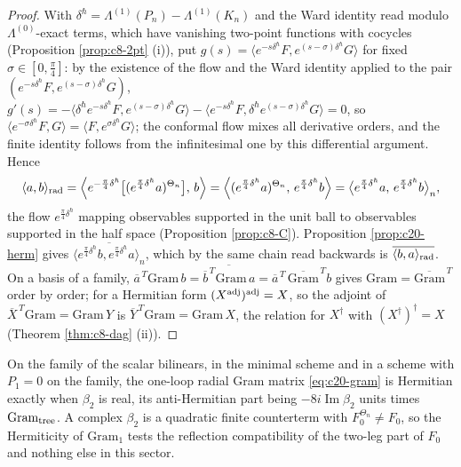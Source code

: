 \begin{proof}
With $\delta^\hbar=\Lambda^{(1)}(P_n)-\Lambda^{(1)}(K_n)$ and the Ward identity read modulo $\Lambda^{(0)}$-exact terms, which have vanishing two-point functions with cocycles (Proposition \ref{prop:c8-2pt} (i)), put $g(s)=\langle e^{-s\delta^\hbar}F,e^{(s-\sigma)\delta^\hbar}G\rangle$ for fixed $\sigma\in[0,\tfrac\pi4]$: by the existence of the flow and the Ward identity applied to the pair $(e^{-s\delta^\hbar}F,e^{(s-\sigma)\delta^\hbar}G)$, $g'(s)=-\langle\delta^\hbar e^{-s\delta^\hbar}F,e^{(s-\sigma)\delta^\hbar}G\rangle-\langle e^{-s\delta^\hbar}F,\delta^\hbar e^{(s-\sigma)\delta^\hbar}G\rangle=0$, so $\langle e^{-\sigma\delta^\hbar}F,G\rangle=\langle F,e^{\sigma\delta^\hbar}G\rangle$; the conformal flow mixes all derivative orders, and the finite identity follows from the infinitesimal one by this differential argument. Hence
\[
\langle a,b\rangle_{\rm rad}=\Big\langle e^{-\frac\pi4\delta^\hbar}\big[(e^{\frac\pi4\delta^\hbar}a)^{\Theta_n}\big],\,b\Big\rangle=\Big\langle(e^{\frac\pi4\delta^\hbar}a)^{\Theta_n},\,e^{\frac\pi4\delta^\hbar}b\Big\rangle=\big\langle e^{\frac\pi4\delta^\hbar}a,\,e^{\frac\pi4\delta^\hbar}b\big\rangle_n ,
\]
the flow $e^{\frac\pi4\delta^\hbar}$ mapping observables supported in the unit ball to observables supported in the half space (Proposition \ref{prop:c8-C}). Proposition \ref{prop:c20-herm} gives $\overline{\langle e^{\frac\pi4\delta^\hbar}b,e^{\frac\pi4\delta^\hbar}a\rangle_n}$, which by the same chain read backwards is $\overline{\langle b,a\rangle_{\rm rad}}$. On a basis of a family, $\overline a^{\,T}\mathrm{Gram}\,b=\overline{\overline b^{\,T}\mathrm{Gram}\,a}=\overline a^{\,T}\,\overline{\mathrm{Gram}}^{\,T}b$ gives $\mathrm{Gram}=\overline{\mathrm{Gram}}^{\,T}$ order by order; for a Hermitian form $(X^{\rm adj})^{\rm adj}=X$, so the adjoint of $\overline X^{\,T}\mathrm{Gram}=\mathrm{Gram}\,Y$ is $\overline Y^{\,T}\mathrm{Gram}=\mathrm{Gram}\,X$, the relation for $X^\dagger$ with $(X^\dagger)^\dagger=X$ (Theorem \ref{thm:c8-dag} (ii)).
\end{proof}

\begin{corollary}
\label{cor:c20-beta2}
On the family of the scalar bilinears, in the minimal scheme and in a scheme with $P_1=0$ on the family, the one-loop radial Gram matrix \eqref{eq:c20-gram} is Hermitian exactly when $\beta_2$ is real, its anti-Hermitian part being $-8i\operatorname{Im}\beta_2$ units times $\mathrm{Gram}_{\rm tree}$. A complex $\beta_2$ is a quadratic finite counterterm with $F_0^{\Theta_n}\ne F_0$, so the Hermiticity of $\mathrm{Gram}_1$ tests the reflection compatibility of the two-leg part of $F_0$ and nothing else in this sector.
\end{corollary}


